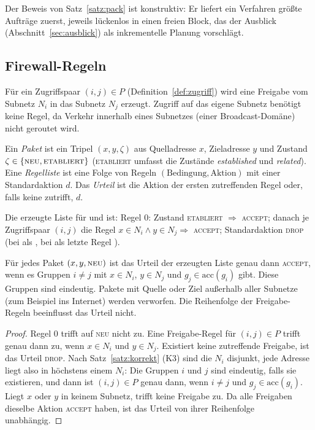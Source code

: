 \begin{bemerkung}
	Der Beweis von Satz~\ref{satz:pack} ist konstruktiv: Er liefert ein Verfahren \glqq größte Aufträge zuerst, jeweils lückenlos in einen freien Block\grqq, das der Ausblick (Abschnitt~\ref{sec:ausblick}) als inkrementelle Planung vorschlägt.
\end{bemerkung}

\subsection{Firewall-Regeln}
\label{sec:firewall}

Für ein Zugriffspaar $(i,j) \in P$ (Definition~\ref{def:zugriff}) wird eine Freigabe vom Subnetz $N_i$ in das Subnetz $N_j$ erzeugt. Zugriff auf das eigene Subnetz benötigt keine Regel, da Verkehr innerhalb eines Subnetzes (einer Broadcast-Domäne) nicht geroutet wird.

\begin{definition}
	Ein \emph{Paket} ist ein Tripel $(x,y,\zeta)$ aus Quelladresse $x$, Zieladresse $y$ und Zustand $\zeta \in \{\textsc{neu}, \textsc{etabliert}\}$ (\textsc{etabliert} umfasst die Zustände \emph{established} und \emph{related}). Eine \emph{Regelliste} ist eine Folge von Regeln $(\text{Bedingung}, \text{Aktion})$ mit einer Standardaktion $d$. Das \emph{Urteil} ist die Aktion der ersten zutreffenden Regel oder, falls keine zutrifft, $d$.
\end{definition}

Die erzeugte Liste für  und  ist: Regel $0$: Zustand \textsc{etabliert} $\Rightarrow$ \textsc{accept}; danach je Zugriffspaar $(i,j)$ die Regel \glqq $x\in N_i \wedge y \in N_j \Rightarrow$ \textsc{accept}\grqq; Standardaktion \textsc{drop} (bei  als , bei  als letzte Regel ).

\begin{satz}
\label{satz:firewall}
	Für jedes Paket $(x,y,\textsc{neu})$ ist das Urteil der erzeugten Liste genau dann \textsc{accept}, wenn es Gruppen $i \neq j$ mit $x\in N_i$, $y\in N_j$ und $g_j \in \text{acc}(g_i)$ gibt. Diese Gruppen sind eindeutig. Pakete mit Quelle oder Ziel außerhalb aller Subnetze (zum Beispiel ins Internet) werden verworfen. Die Reihenfolge der Freigabe-Regeln beeinflusst das Urteil nicht.
\end{satz}

\begin{proof}
	Regel $0$ trifft auf \textsc{neu} nicht zu. Eine Freigabe-Regel für $(i,j)\in P$ trifft genau dann zu, wenn $x \in N_i$ und $y \in N_j$. Existiert keine zutreffende Freigabe, ist das Urteil \textsc{drop}. Nach Satz~\ref{satz:korrekt} (K3) sind die $N_i$ disjunkt, jede Adresse liegt also in höchstens einem $N_i$: Die Gruppen $i$ und $j$ sind eindeutig, falls sie existieren, und dann ist $(i,j)\in P$ genau dann, wenn $i\neq j$ und $g_j \in\text{acc}(g_i)$. Liegt $x$ oder $y$ in keinem Subnetz, trifft keine Freigabe zu. Da alle Freigaben dieselbe Aktion \textsc{accept} haben, ist das Urteil von ihrer Reihenfolge unabhängig.
\end{proof}

